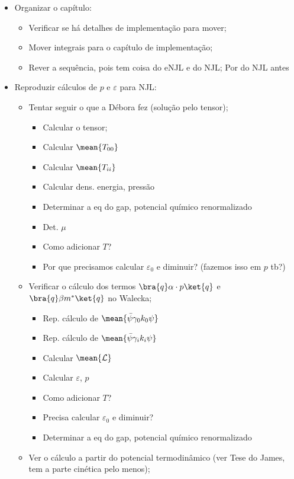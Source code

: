 \begin{itemize}
	\item Organizar o capítulo:
		\begin{itemize}
			\item Verificar se há detalhes de implementação para mover;
			\item Mover integrais para o capítulo de implementação;
			\item Rever a sequência, pois tem coisa do eNJL e do NJL; Por do NJL antes
		\end{itemize}
	\item Reproduzir cálculos de $p$ e $\varepsilon$ para NJL:
		\begin{itemize}
			\item Tentar seguir o que a Débora fez (solução pelo tensor);
				\begin{itemize}
					\item Calcular o tensor;
					\item Calcular $\mean{T_{00}}$
					\item Calcular $\mean{T_{ii}}$
					\item Calcular dens. energia, pressão
					\item Determinar a eq do gap, potencial químico renormalizado
					\item Det. $\mu$
					\item Como adicionar $T$?
					\item Por que precisamos calcular $\varepsilon_0$ e diminuir? (fazemos isso em $p$ tb?)
				\end{itemize}
			\item Verificar o cálculo dos termos $\bra{q}\alpha\cdot p\ket{q}$ e $\bra{q}\beta m^*\ket{q}$ no Walecka;
				\begin{itemize}
					\item Rep. cálculo de $\mean{\bar\psi\gamma_0 k_0\psi}$
					\item Rep. cálculo de $\mean{\bar\psi\gamma_i k_i\psi}$
					\item Calcular $\mean{\mathcal{L}}$
					\item Calcular $\varepsilon$, $p$
					\item Como adicionar $T$?
					\item Precisa calcular $\varepsilon_0$ e diminuir?
					\item Determinar a eq do gap, potencial químico renormalizado
				\end{itemize}
			\item Ver o cálculo a partir do potencial termodinâmico (ver Tese do James, tem a parte cinética pelo menos);

\end{itemize}
\end{itemize}
